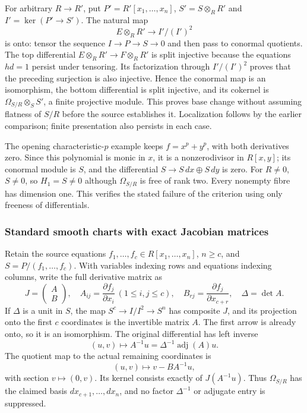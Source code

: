 For arbitrary \(R\to R'\), put \(P'=R'[x_1,\ldots,x_n]\), \(S'=S\otimes_RR'\) and \(I'=\ker(P'\to S')\). The natural map \[
E\otimes_RR'\longrightarrow I'/(I')^2
\] is onto: tensor the sequence \(I\to P\to S\to0\) and then pass to conormal quotients. The top differential \(E\otimes_RR'\to F\otimes_RR'\) is split injective because the equations \(hd=1\) persist under tensoring. Its factorization through \(I'/(I')^2\) proves that the preceding surjection is also injective. Hence the conormal map is an isomorphism, the bottom differential is split injective, and its cokernel is \(\Omega_{S/R}\otimes_SS'\), a finite projective module. This proves base change without assuming flatness of \(S/R\) before the source establishes it. Localization follows by the earlier comparison; finite presentation also persists in each case.

The opening characteristic-\(p\) example keeps \(f=x^p+y^p\), with both derivatives zero. Since this polynomial is monic in \(x\), it is a nonzerodivisor in \(R[x,y]\); its conormal module is \(S\), and the differential \(S\to S\,dx\oplus S\,dy\) is zero. For \(R\ne0\), \(S\ne0\), so \(H_1=S\ne0\) although \(\Omega_{S/R}\) is free of rank two. Every nonempty fibre has dimension one. This verifies the stated failure of the criterion using only freeness of differentials.

\subsubsection{Standard smooth charts with exact Jacobian matrices}\label{standard-smooth-charts-with-exact-jacobian-matrices}

Retain the source equations \(f_1,\ldots,f_c\in R[x_1,\ldots,x_n]\), \(n\ge c\), and \(S=P/(f_1,\ldots,f_c)\). With variables indexing rows and equations indexing columns, write the full derivative matrix as \[
J=\begin{pmatrix}A\\B\end{pmatrix},\quad
A_{ij}=\frac{\partial f_j}{\partial x_i}\ (1\le i,j\le c),\quad
B_{rj}=\frac{\partial f_j}{\partial x_{c+r}},\quad
\Delta=\det A.
\] If \(\Delta\) is a unit in \(S\), the map \(S^c\to I/I^2\to S^n\) has composite \(J\), and its projection onto the first \(c\) coordinates is the invertible matrix \(A\). The first arrow is already onto, so it is an isomorphism. The original differential has left inverse \[
(u,v)\longmapsto A^{-1}u=\Delta^{-1}\operatorname{adj}(A)u.
\] The quotient map to the actual remaining coordinates is \[
(u,v)\longmapsto v-BA^{-1}u,
\] with section \(v\mapsto(0,v)\). Its kernel consists exactly of \(J(A^{-1}u)\). Thus \(\Omega_{S/R}\) has the claimed basis \(dx_{c+1},\ldots,dx_n\), and no factor \(\Delta^{-1}\) or adjugate entry is suppressed.

